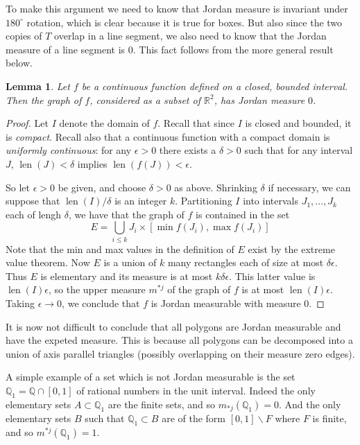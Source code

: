 \documentclass[11pt,oneside]{amsbook}
\renewcommand{\setminus}{\smallsetminus}
\newcommand{\QQ}{\mathbb Q}
\newcommand{\RR}{\mathbb R}
\DeclareMathOperator{\len}{len}
\theoremstyle{definition}
\theoremstyle{plain}
\newtheorem{lem}[thm]{Lemma}
\theoremstyle{definition}
\theoremstyle{remark}
\numberwithin{equation}{section}
\numberwithin{figure}{section}
\begin{document}
To make this argument we need to know that Jordan measure is invariant under $180^\circ$ rotation, which is clear because it is true for boxes. But also since the two copies of $T$ overlap in a line segment, we also need to know that the Jordan measure of a line segment is $0$. This fact follows from the more general result below.

\begin{lem}
  \label{lem:jordan-graph}
  Let $f$ be a continuous function defined on a closed, bounded interval. Then the graph of $f$, considered as a subset of $\RR^2$, has Jordan measure $0$.
\end{lem}

\begin{proof}
  Let $I$ denote the domain of $f$. Recall that since $I$ is closed and bounded, it is \emph{compact}. Recall also that a continuous function with a compact domain is \emph{uniformly continuous}: for any $\epsilon>0$ there exists a $\delta>0$ such that for any interval $J$, $\len(J)<\delta$ implies $\len(f(J))<\epsilon$.

  So let $\epsilon>0$ be given, and choose $\delta>0$ as above. Shrinking $\delta$ if necessary, we can suppose that $\len(I)/\delta$ is an integer $k$. Partitioning $I$ into intervals $J_1,\ldots,J_k$ each of lengh $\delta$, we have that the graph of $f$ is contained in the set
  \[E=\bigcup_{i\leq k} J_i\times[\min f(J_i),\max f(J_i)]
  \]
  Note that the min and max values in the definition of $E$ exist by the extreme value theorem. Now $E$ is a union of $k$ many rectangles each of size at most $\delta\epsilon$. Thus $E$ is elementary and its measure is at most $k\delta\epsilon$. This latter value is $\len(I)\epsilon$, so the upper measure $m^{*j}$ of the graph of $f$ is at most $\len(I)\epsilon$. Taking $\epsilon\to0$, we conclude that $f$ is Jordan measurable with measure $0$.
\end{proof}

It is now not difficult to conclude that all polygons are Jordan measurable and have the expeted measure. This is because all polygons can be decomposed into a union of axis parallel triangles (possibly overlapping on their measure zero edges).

A simple example of a set which is not Jordan measurable is the set $\QQ_1=\QQ\cap[0,1]$ of rational numbers in the unit interval. Indeed the only elementary sets $A\subset\QQ_1$ are the finite sets, and so $m_{*j}(\QQ_1)=0$. And the only elementary sets $B$ such that $\QQ_1\subset B$ are of the form $[0,1]\setminus F$ where $F$ is finite, and so $m^{*j}(\QQ_1)=1$.
\end{document}
